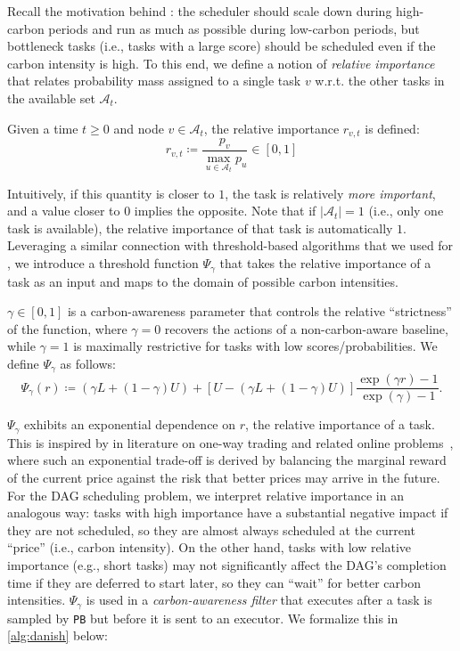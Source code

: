 Recall the motivation behind \DANISH: 
the scheduler should scale down during high-carbon periods and run as much as possible during low-carbon periods, but bottleneck tasks (i.e., tasks with a large score) should be scheduled even if the carbon intensity is high.  To this end, we define a notion of \textit{relative importance} that relates probability mass assigned to a single task $v$ w.r.t. the other tasks in the available set $\mathcal{A}_t$.

\begin{dfn} \label{dfn:rel-imp}
Given a time $t \geq 0$ and node $v \in \mathcal{A}_t$, the relative importance $r_{v,t}$ is defined:
    $$r_{v,t} \coloneqq \frac{p_v}{\max_{u \in \mathcal{A}_t} p_u} \in [0,1]$$
\end{dfn}

Intuitively, if this quantity is closer to $1$, the task is relatively \textit{more important}, and a value closer to $0$ implies the opposite.
Note that if $\vert \mathcal{A}_t \vert =1$ (i.e., only one task is available), the relative importance of that task is automatically $1$.  Leveraging a similar connection with threshold-based algorithms that we used for \CAP, we introduce a threshold function $\Psi_\gamma$ that takes the relative importance of a task as an input and maps to the domain of possible carbon intensities.  

$\gamma \in [0,1]$ is a carbon-awareness parameter that controls the relative ``strictness'' of the function, where $\gamma = 0$ recovers the actions of a non-carbon-aware baseline, while $\gamma = 1$ is maximally restrictive for tasks with low scores/probabilities.  We define $\Psi_\gamma$ as follows:
{\small
\begin{equation}
    \Psi_\gamma(r) \coloneqq \left( \gamma L + (1-\gamma) U \right) + \left[ U - \left( \gamma L + (1-\gamma) U \right)\right] \frac{\exp (\gamma r) -1 }{\exp (\gamma) -1}. \label{eq:Psi}
\end{equation}
}

$\Psi_\gamma$ exhibits an exponential dependence on $r$, the relative importance of a task.  This is inspired by in literature on one-way trading and related online problems~\cite{ElYaniv:01, Zhou:08}, where such an exponential trade-off is derived by balancing the marginal reward of the current price against the risk that better prices may arrive in the future.  For the DAG scheduling problem, we interpret relative importance in an analogous way: tasks with high importance have a substantial negative impact if they are not scheduled, so they are almost always scheduled at the current ``price'' (i.e., carbon intensity).  On the other hand, tasks with low relative importance (e.g., short tasks) may not significantly affect the DAG's completion time if they are deferred to start later, so they can ``wait'' for better carbon intensities.
$\Psi_\gamma$ is used in a \textit{carbon-awareness filter} that executes after a task is sampled by \texttt{PB} but before it is sent to an executor.  We formalize this in \autoref{alg:danish} below:

